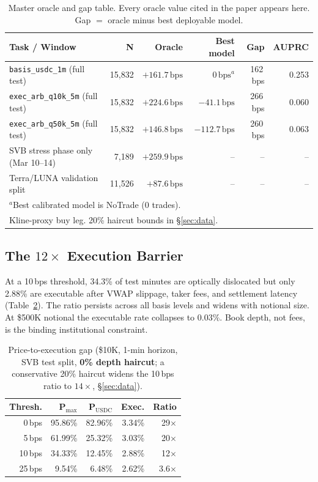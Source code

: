 \documentclass[sigconf,anonymous,natbib=false]{acmart}
\newcommand{\bps}{\,\text{bps}}
\newcommand{\task}[1]{\texttt{\small #1}}
\begin{document}
\begin{table}[t]
\centering
\caption{Master oracle and gap table.
  Every oracle value cited in the paper appears here.
  Gap $=$ oracle minus best deployable model.}
\label{tab:master}
\setlength{\tabcolsep}{3pt}
{\scriptsize
\begin{tabular}{lrrrrr}
\toprule
\textbf{Task / Window} & \textbf{N} & \textbf{Oracle} & \textbf{Best model} & \textbf{Gap} & \textbf{AUPRC}\\
\midrule
\task{basis\_usdc\_1m} (full test)       & 15,832 & $+161.7\bps$ & $0\bps^a$ & 162\,bps & 0.253\\
\task{exec\_arb\_q10k\_5m} (full test)   & 15,832 & $+224.6\bps$ & $-41.1\bps$ & 266\,bps & 0.060\\
\task{exec\_arb\_q50k\_5m} (full test)   & 15,832 & $+146.8\bps$ & $-112.7\bps$ & 260\,bps & 0.063\\
\midrule
SVB stress phase only (Mar 10--14)       &  7,189 & $+259.9\bps$ & -- & -- & --\\
Terra/LUNA validation split              & 11,526 & $+87.6\bps$  & -- & -- & --\\
\bottomrule
\multicolumn{6}{l}{\footnotesize $^a$Best calibrated model is NoTrade (0 trades).}\\
\multicolumn{6}{l}{\footnotesize Kline-proxy buy leg. 20\% haircut bounds in \S\ref{sec:data}.}\\
\end{tabular}
}
\end{table}

\subsection{The $12\times$ Execution Barrier}
\label{sec:gap}

At a 10\,bps threshold, 34.3\% of test minutes are optically
dislocated but only 2.88\% are executable after VWAP slippage,
taker fees, and settlement latency (Table~\ref{tab:gap}).
The ratio persists across all basis levels and widens with notional
size. At \$500K notional the executable rate collapses to $0.03\%$. Book depth, not fees, is the binding institutional constraint.

\begin{table}[t]
\centering
\caption{Price-to-execution gap (\$10K, 1-min horizon, SVB test split,
  \textbf{0\% depth haircut}; a conservative 20\% haircut widens the 10\,bps
  ratio to $14\times$, \S\ref{sec:data}).}
\label{tab:gap}
\setlength{\tabcolsep}{3pt}
{\small
\begin{tabular}{rrrrr}
\toprule
\textbf{Thresh.} & \textbf{P$_{\max}$} & \textbf{P$_{\text{USDC}}$} &
\textbf{Exec.} & \textbf{Ratio}\\
\midrule
 0\,bps & 95.86\% & 82.96\% & 3.34\% & 29$\times$\\
 5\,bps & 61.99\% & 25.32\% & 3.03\% & 20$\times$\\
10\,bps & 34.33\% & 12.45\% & 2.88\% & 12$\times$\\
25\,bps &  9.54\% &  6.48\% & 2.62\% &  3.6$\times$\\
\bottomrule
\end{tabular}
}
\end{table}
\end{document}
